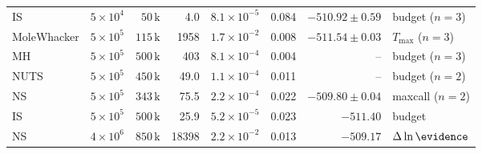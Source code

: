 \begin{tabular}{@{}llrrrrrl@{}}
  IS & \(5 \times 10^{4}\) & \(50\,\mathrm{k}\) & 4.0 & \(8.1 \times 10^{-5}\) & 0.084 & \(-510.92 \pm 0.59\) & budget (\(n=3\)) \\
  MoleWhacker & \(5 \times 10^{5}\) & \(115\,\mathrm{k}\) & 1958 & \(1.7 \times 10^{-2}\) & 0.008 & \(-511.54 \pm 0.03\) & \(T_{\max}\) (\(n=3\)) \\
  MH & \(5 \times 10^{5}\) & \(500\,\mathrm{k}\) & 403 & \(8.1 \times 10^{-4}\) & 0.004 & -- & budget (\(n=3\)) \\
  NUTS & \(5 \times 10^{5}\) & \(450\,\mathrm{k}\) & 49.0 & \(1.1 \times 10^{-4}\) & 0.011 & -- & budget (\(n=2\)) \\
  NS & \(5 \times 10^{5}\) & \(343\,\mathrm{k}\) & 75.5 & \(2.2 \times 10^{-4}\) & 0.022 & \(-509.80 \pm 0.04\) & maxcall (\(n=2\)) \\
  IS & \(5 \times 10^{5}\) & \(500\,\mathrm{k}\) & 25.9 & \(5.2 \times 10^{-5}\) & 0.023 & \(-511.40\) & budget \\
  NS & \(4 \times 10^{6}\) & \(850\,\mathrm{k}\) & 18398 & \(2.2 \times 10^{-2}\) & 0.013 & \(-509.17\) & \(\Delta\ln\evidence\) \\
  \bottomrule
\end{tabular}
